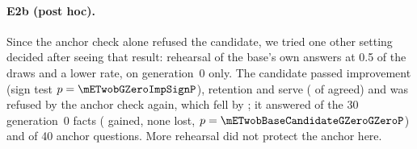 \begin{table}[t]
\centering
\small

\caption{E2 and E3, second wave: the release gate's four checks on each candidate. A refused
check is the reason the candidate was not released.}\label{tab:gate}
\end{table}

\begin{table}[t]
\centering
\small

\caption{E2 and E3, second wave: facts answered (at least three of four probes) with Wilson 95\%
intervals, and anchor questions right, for the unadapted policy and for each candidate
(measured whether or not the gate released it). 30 facts per generation.}\label{tab:e2}
\end{table}

\paragraph{E2b (post hoc).} Since the anchor check alone refused the candidate, we tried one other setting
decided after seeing that result: rehearsal of the base's own answers at 0.5 of the draws and a lower
rate, on generation~0 only. The candidate passed improvement (sign test $p=\mETwobGZeroImpSignP$), retention
and serve (\mETwobGZeroServeAgreed{} of \mETwobGZeroServeSampled{} agreed) and was refused by the anchor check
again, which fell by \mETwobGZeroAnchorDrop{}; it answered \mETwobCandidateGZeroGZero{} of the 30
generation~0 facts (\mETwobBaseCandidateGZeroGZeroGained{} gained, none lost,
$p=\mETwobBaseCandidateGZeroGZeroP$) and \mETwobCandidateGZeroAnchor{} of 40 anchor questions.
More rehearsal did not protect the anchor here.

